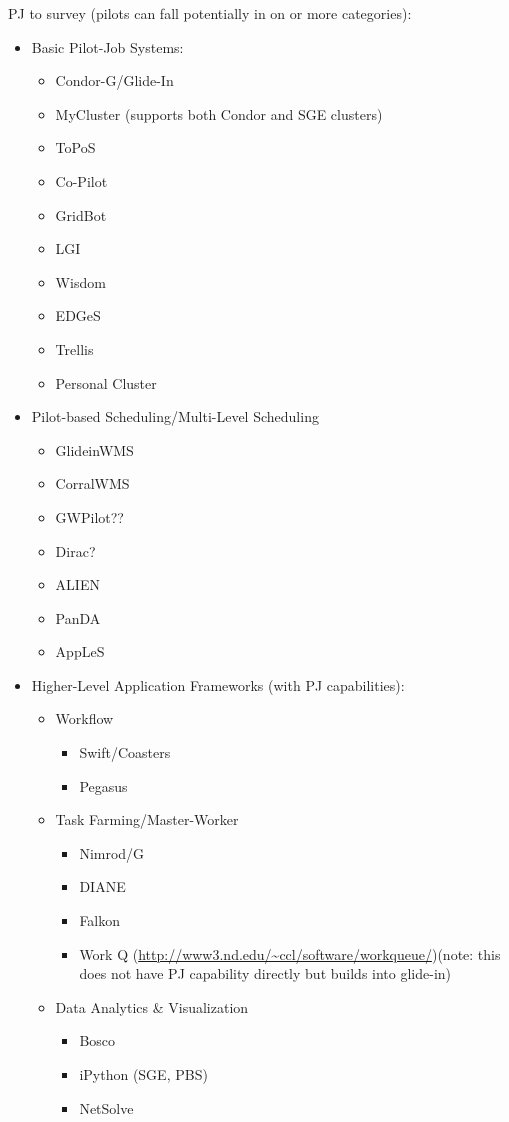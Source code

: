 \documentclass{sig-alternate}
\begin{document}
PJ to survey (pilots can fall potentially in on or more categories):
\begin{itemize}
	\item Basic Pilot-Job Systems: 
	\begin{itemize}
		\item Condor-G/Glide-In
		\item MyCluster (supports both Condor and SGE clusters)
		\item ToPoS 
		\item Co-Pilot
		\item GridBot~\cite{Silberstein:2009:GEB:1654059.1654071}
		\item LGI
		\item Wisdom
		\item EDGeS
		\item Trellis
		\item Personal Cluster
	\end{itemize}
	\item Pilot-based Scheduling/Multi-Level Scheduling
	\begin{itemize}
		\item GlideinWMS~\cite{1742-6596-119-6-062044}
		\item CorralWMS
		\item GWPilot??~\cite{gridway} 
		\item Dirac?
        \item ALIEN
		\item PanDA  
		\item AppLeS
	\end{itemize}
	\item Higher-Level Application Frameworks (with PJ capabilities):
	\begin{itemize}
		\item Workflow
		\begin{itemize}
			\item Swift/Coasters
			\item Pegasus
		\end{itemize}
		\item Task Farming/Master-Worker
		\begin{itemize}
			\item Nimrod/G 
			\item DIANE
			\item Falkon 
            \item Work Q (\url{http://www3.nd.edu/~ccl/software/workqueue/})(note: this does not have PJ capability directly but builds into glide-in)
		\end{itemize}
		\item Data Analytics \& Visualization
		\begin{itemize}
			\item Bosco
			\item iPython (SGE, PBS)
			\item NetSolve~\cite{Casanova:1995:NNS:898848}
		\end{itemize}		
	\end{itemize}
\end{itemize}
\end{document}
